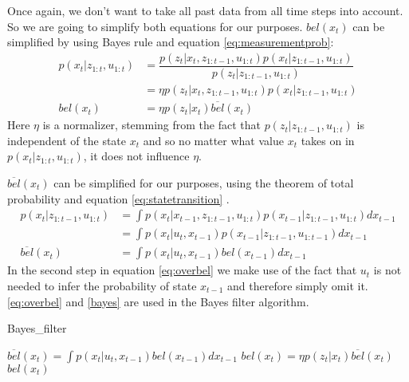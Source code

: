Once again, we don't want to take all past data from all time steps into account. So we are going to simplify both equations for our purposes. $bel(x_t)$ can be simplified by using Bayes rule and equation \ref{eq:measurementprob}:
\begin{equation}\label{bayes}
\begin{aligned}
p(x_t|z_{1:t}, u_{1:t}) &= \dfrac{p(z_t|x_t,z_{1:t-1},u_{1:t})p(x_t|z_{1:t-1},u_{1:t})}{p(z_t|z_{1:t-1},u_{1:t})}\\
&= \eta p(z_t|x_t,z_{1:t-1},u_{1:t})p(x_t|z_{1:t-1},u_{1:t})\\
bel(x_t) &= \eta p(z_t|x_t)\overline{bel}(x_t)
\end{aligned}
\end{equation}
Here $\eta$ is a normalizer, stemming from the fact that $p(z_t|z_{1:t-1},u_{1:t})$ is independent of the state $x_t$ and so no matter what value $x_t$ takes on in $p(x_t|z_{1:t},u_{1:t})$, it does not influence $\eta$.

$\overline{bel}(x_t)$ can be simplified for our purposes, using the theorem of total probability and equation \ref{eq:statetransition} \citep[p.\ 31-33]{Thrun:2005:PR:1121596}.
\begin{equation} \label{eq:overbel}
\begin{aligned}
p(x_t|z_{1:t-1},u_{1:t}) &= \int p(x_t|x_{t-1},z_{1:t-1},u_{1:t})p(x_{t-1}|z_{1:t-1},u_{1:t})dx_{t-1}\\
&= \int p(x_t|u_t,x_{t-1})p(x_{t-1}|z_{1:t-1},u_{1:t-1})dx_{t-1}\\
\overline{bel}(x_t) &= \int p(x_t|u_t,x_{t-1})bel(x_{t-1})dx_{t-1}
\end{aligned}
\end{equation}
In the second step in equation \ref{eq:overbel} we make use of the fact that $u_t$ is not needed to infer the probability of state $x_{t-1}$ and therefore simply omit it. 
\ref{eq:overbel} and \ref{bayes} are used in the Bayes filter algorithm.
\begin{algorithm}
\caption{Bayes\_filter \citep[p.\ 27]{Thrun:2005:PR:1121596}}
\label{bayes_filter}
\begin{algorithmic}[1]
\State $\overline{bel}(x_t) = \int p(x_t|u_t,x_{t-1})bel(x_{t-1})dx_{t-1}$
\State $bel(x_t) = \eta p(z_t|x_t)\overline{bel}(x_t)$
\EndFor
\State \Return $bel(x_t)$
\EndProcedure
\end{algorithmic}
\end{algorithm}

